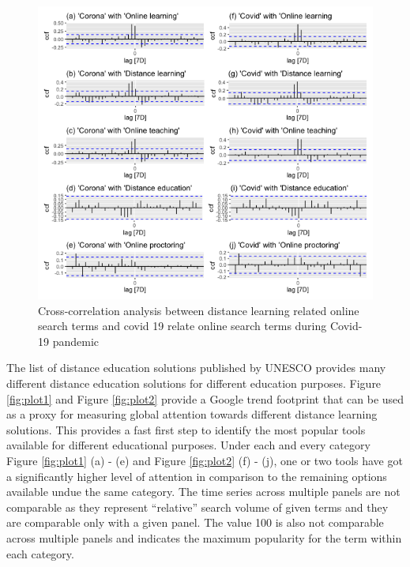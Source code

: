 \documentclass[11pt,a4paper,]{article}
\begin{document}
\begin{figure}[h]

{\centering \includegraphics[width=1\textwidth]{figure/ccfAnalysis-1} 

}

\caption{Cross-correlation analysis between distance learning related online search terms and covid 19 relate online search terms during Covid-19 pandemic}\label{fig:ccfAnalysis}
\end{figure}

The list of distance education solutions published by UNESCO provides many different distance education solutions for different education purposes. Figure \ref{fig:plot1} and Figure \ref{fig:plot2} provide a Google trend footprint that can be used as a proxy for measuring global attention towards different distance learning solutions. This provides a fast first step to identify the most popular tools available for different educational purposes. Under each and every category Figure \ref{fig:plot1} (a) - (e) and Figure \ref{fig:plot2} (f) - (j), one or two tools have got a significantly higher level of attention in comparison to the remaining options available undue the same category. The time series across multiple panels are not comparable as they represent ``relative'' search volume of given terms and they are comparable only with a given panel. The value 100 is also not comparable across multiple panels and indicates the maximum popularity for the term within each category.
\end{document}
